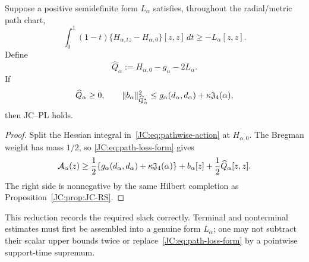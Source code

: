 \begin{proposition}
\label{JC:prop:JC-RC}
Suppose a positive semidefinite form $L_\alpha$ satisfies, throughout the
radial/metric path chart,
\begin{equation}\label{JC:eq:path-loss-form}
 \int_0^1(1-t)
 \{H_{\alpha,tz}-H_{\alpha,0}\}[z,z]\,dt
 \ge-L_\alpha[z,z].
\end{equation}
Define
\begin{equation}\label{JC:eq:root-after-path-loss}
 \widehat Q_\alpha:=H_{\alpha,0}-g_\alpha-2L_\alpha.
\end{equation}
If
\begin{equation}\label{JC:eq:root-path-Schur}
 \widehat Q_\alpha\ge0,
 \qquad
 \|b_\alpha\|_{\widehat Q_\alpha^*}^2
 \le g_\alpha(d_\alpha,d_\alpha)+\kappa\mathfrak J_4(\alpha),
\end{equation}
then JC--PL holds.
\end{proposition}

\begin{proof}
Split the Hessian integral in~\eqref{JC:eq:pathwise-action} at
$H_{\alpha,0}$.  The Bregman weight has mass $1/2$, so
\eqref{JC:eq:path-loss-form} gives
\[
 \mathcal{A}_\alpha(z)
 \ge\frac12\{g_\alpha(d_\alpha,d_\alpha)
                 +\kappa\mathfrak J_4(\alpha)\}
     +b_\alpha[z]
     +\frac12\widehat Q_\alpha[z,z].
\]
The right side is nonnegative by the same Hilbert completion as
Proposition~\ref{JC:prop:JC-RS}.
\end{proof}

This reduction records the required slack correctly.  Terminal and
nonterminal estimates must first be assembled into a genuine form
$L_\alpha$; one may not subtract their scalar upper bounds twice or
replace~\eqref{JC:eq:path-loss-form} by a pointwise support-time supremum.

